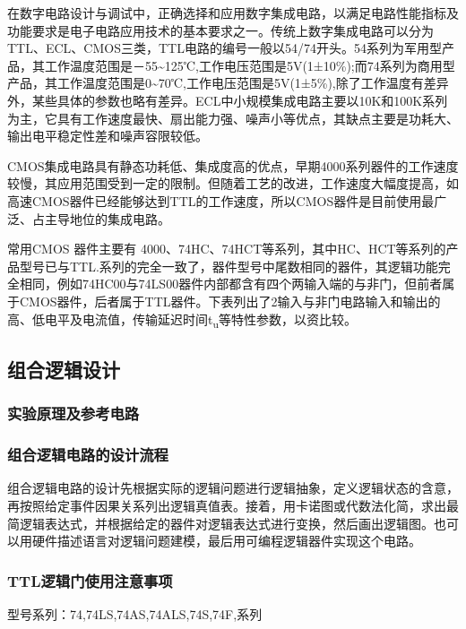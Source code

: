 \documentclass[a4paper,12pt]{article}
\begin{document}
在数字电路设计与调试中，正确选择和应用数字集成电路，以满足电路性能指标及功能要求是电子电路应用技术的基本要求之一。传统上数字集成电路可以分为TTL、ECL、CMOS三类，TTL电路的编号一般以54/74开头。54系列为军用型产品，其工作温度范围是－55\textasciitilde125℃,工作电压范围是5V(1±10\%);而74系列为商用型产品，其工作温度范围是0\textasciitilde70℃,工作电压范围是5V(1±5\%),除了工作温度有差异外，某些具体的参数也略有差异。ECL中小规模集成电路主要以10K和100K系列为主，它具有工作速度最快、扇出能力强、噪声小等优点，其缺点主要是功耗大、输出电平稳定性差和噪声容限较低。

CMOS集成电路具有静态功耗低、集成度高的优点，早期4000系列器件的工作速度较慢，其应用范围受到一定的限制。但随着工艺的改进，工作速度大幅度提高，如高速CMOS器件已经能够达到TTL的工作速度，所以CMOS器件是目前使用最广泛、占主导地位的集成电路。

常用CMOS 器件主要有 4000、74HC、74HCT等系列，其中HC、HCT等系列的产品型号已与TTL.系列的完全一致了，器件型号中尾数相同的器件，其逻辑功能完全相同，例如74HC00与74LS00器件内部都含有四个两输入端的与非门，但前者属于CMOS器件，后者属于TTL器件。下表列出了2输入与非门电路输入和输出的高、低电平及电流值，传输延迟时间t\textsubscript{u}等特性参数，以资比较。



\subsection{组合逻辑设计}

\subsubsection{实验原理及参考电路}

\subsubsection{组合逻辑电路的设计流程}

组合逻辑电路的设计先根据实际的逻辑问题进行逻辑抽象，定义逻辑状态的含意，再按照给定事件因果关系列出逻辑真值表。接着，用卡诺图或代数法化简，求出最简逻辑表达式，并根据给定的器件对逻辑表达式进行变换，然后画出逻辑图。也可以用硬件描述语言对逻辑问题建模，最后用可编程逻辑器件实现这个电路。

\subsubsection{TTL逻辑门使用注意事项}

型号系列：74,74LS,74AS,74ALS,74S,74F,系列
\end{document}
